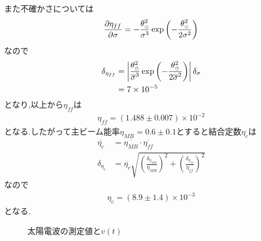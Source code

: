また不確かさについては
\begin{align}
  \frac{\partial\eta_{ff}}{\partial\sigma}=-\frac{\theta_{\tiny\astrosun}^2}{\sigma^3}\exp\left(-\frac{\theta_{\tiny\astrosun}^2}{2\sigma^2}\right)
\end{align}
なので
\begin{align}
  \delta_{\eta_{ff}}&=\left|\frac{\theta_{\tiny\astrosun}^2}{\overline{\sigma}^3}\exp\left(-\frac{\theta_{\tiny\astrosun}^2}{2\overline{\sigma}^2}\right)\right|\delta_{\sigma}\\
  &=7\times10^{-5}
\end{align}
となり,以上から$\eta_{ff}$は
\begin{align}
  \eta_{ff}=(1.488\pm0.007)\times10^{-2}
\end{align}
となる.したがって主ビーム能率$\eta_{MB}=0.6\pm0.1$とすると結合定数$\eta_c$は
\begin{align}
  \overline{\eta_c}&=\overline{\eta_{MB}}\cdot\overline{\eta_{ff}}\\
  \delta_{\eta_c}&=\overline{\eta_c}\sqrt{\left(\frac{\delta_{\eta_{MB}}}{\eta_{MB}}\right)^2+\left(\frac{\delta_{\eta_{ff}}}{\eta_{ff}}\right)^2}
\end{align}
なので
\begin{align}
  \eta_c=(8.9\pm 1.4)\times 10^{-3}
\end{align}
となる.
\begin{figure}[hptb]
\begin{center}

\caption{太陽電波の測定値と$v(t)$}
\label{fig:solar_radio_fit}
\end{center}
\end{figure}
\clearpage
